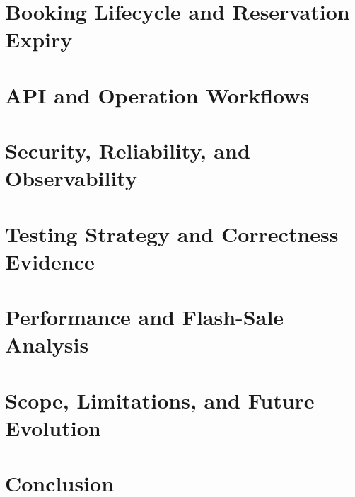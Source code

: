 \documentclass[a4paper,12pt,oneside]{report}
\begin{document}
\chapter{Booking Lifecycle and Reservation Expiry}


\chapter{API and Operation Workflows}


\chapter{Security, Reliability, and Observability}


\chapter{Testing Strategy and Correctness Evidence}


\chapter{Performance and Flash-Sale Analysis}


\chapter{Scope, Limitations, and Future Evolution}


\chapter{Conclusion}

\end{document}
